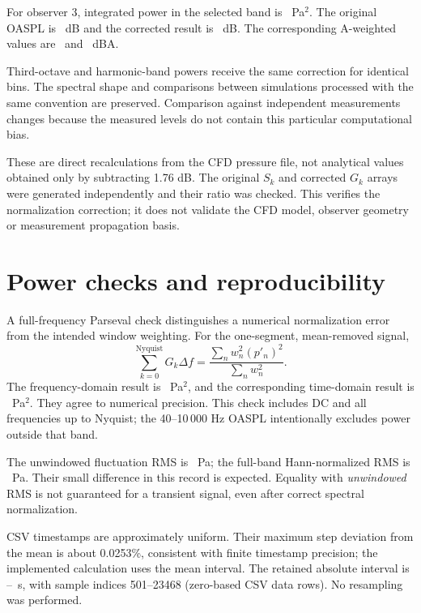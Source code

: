 \documentclass[english]{achleitner-report}
\begin{document}
For observer 3, integrated power in the selected band is \BandPower\ Pa$^2$. The original OASPL is \WrongDB\ dB and the corrected result is \CorrectDB\ dB. The corresponding A-weighted values are \WrongDBA\ and \CorrectDBA\ dBA.

Third-octave and harmonic-band powers receive the same correction for identical bins. The spectral shape and comparisons between simulations processed with the same convention are preserved. Comparison against independent measurements changes because the measured levels do not contain this particular computational bias.

These are direct recalculations from the CFD pressure file, not analytical values obtained only by subtracting 1.76 dB. The original $S_k$ and corrected $G_k$ arrays were generated independently and their ratio was checked. This verifies the normalization correction; it does not validate the CFD model, observer geometry or measurement propagation basis.
\clearpage

\section{Power checks and reproducibility}
A full-frequency Parseval check distinguishes a numerical normalization error from the intended window weighting. For the one-segment, mean-removed signal,
\begin{equation*}
 \sum_{k=0}^{\mathrm{Nyquist}}G_k\Delta f
 =\frac{\sum_nw_n^2(p'_n)^2}{\sum_nw_n^2}.
\end{equation*}
The frequency-domain result is \PowerFrequency\ Pa$^2$, and the corresponding time-domain result is \PowerTime\ Pa$^2$. They agree to numerical precision. This check includes DC and all frequencies up to Nyquist; the 40--10\,000 Hz OASPL intentionally excludes power outside that band.

The unwindowed fluctuation RMS is \RawRMS\ Pa; the full-band Hann-normalized RMS is \WindowRMS\ Pa. Their small difference in this record is expected. Equality with \emph{unwindowed} RMS is not guaranteed for a transient signal, even after correct spectral normalization.

CSV timestamps are approximately uniform. Their maximum step deviation from the mean is about 0.0253\%, consistent with finite timestamp precision; the implemented calculation uses the mean interval. The retained absolute interval is \SignalStart--\SignalStop\ s, with sample indices 501--23468 (zero-based CSV data rows). No resampling was performed.
\end{document}
